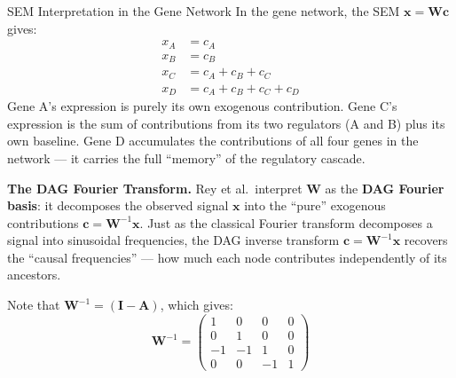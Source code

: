 \begin{examplebox}{SEM Interpretation in the Gene Network}
In the gene network, the SEM $\mathbf{x} = \mathbf{W}\mathbf{c}$ gives:
\begin{align*}
    x_A &= c_A \\
    x_B &= c_B \\
    x_C &= c_A + c_B + c_C \\
    x_D &= c_A + c_B + c_C + c_D
\end{align*}
Gene A's expression is purely its own exogenous contribution. Gene C's
expression is the sum of contributions from its two regulators (A and B) plus
its own baseline. Gene D accumulates the contributions of all four genes in the
network --- it carries the full ``memory'' of the regulatory cascade.

\medskip
\textbf{The DAG Fourier Transform.} Rey et al.\ interpret $\mathbf{W}$ as the
\textbf{DAG Fourier basis}: it decomposes the observed signal $\mathbf{x}$ into
the ``pure'' exogenous contributions $\mathbf{c} = \mathbf{W}^{-1}\mathbf{x}$.
Just as the classical Fourier transform decomposes a signal into sinusoidal
frequencies, the DAG inverse transform $\mathbf{c} = \mathbf{W}^{-1}\mathbf{x}$
recovers the ``causal frequencies'' --- how much each node contributes
independently of its ancestors.

Note that $\mathbf{W}^{-1} = (\mathbf{I} - \mathbf{A})$, which gives:
\[
    \mathbf{W}^{-1} = \begin{pmatrix}1&0&0&0\\0&1&0&0\\-1&-1&1&0\\0&0&-1&1\end{pmatrix}
\]
\end{examplebox}

